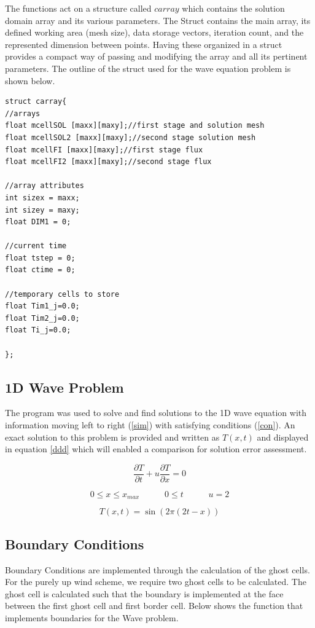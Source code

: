 \documentclass[paper=a4, fontsize=11pt, abstract=on]{scrartcl}
\numberwithin{equation}{section}		%
\numberwithin{figure}{section}			%
\numberwithin{table}{section}				%
\begin{document}
The functions act on a structure called $carray$ which contains the solution domain array and its various parameters. The Struct contains the main array, its defined working area (mesh size), data storage vectors, iteration count, and the represented dimension between points. Having these organized in a struct provides a compact way of passing and modifying the array and all its pertinent parameters. The outline of the struct used for the wave equation problem is shown below.


\begin{lstlisting}
struct carray{
//arrays
float mcellSOL [maxx][maxy];//first stage and solution mesh
float mcellSOL2 [maxx][maxy];//second stage solution mesh
float mcellFI [maxx][maxy];//first stage flux
float mcellFI2 [maxx][maxy];//second stage flux

//array attributes
int sizex = maxx;
int sizey = maxy;
float DIM1 = 0;

//current time 
float tstep = 0;
float ctime = 0;

//temporary cells to store
float Tim1_j=0.0;
float Tim2_j=0.0;
float Ti_j=0.0;

};
\end{lstlisting}
 
\subsection{1D Wave Problem}
The program was used to solve and find solutions to the 1D wave equation with information moving left to right (\ref{sim}) with satisfying conditions (\ref{con}). An exact solution to this problem is provided and written as $T(x,t)$ and displayed in equation \ref{ddd} which will enabled a comparison for solution error assessment. 

 \begin{equation}
\label{sim}
\frac{\partial T}{\partial t} + u\frac{\partial T}{\partial x} = 0
\end{equation}

 \begin{equation}
\label{con}
0\leq x \leq x_{max} \hspace{35pt} 0 \leq t \hspace{35pt} u = 2
\end{equation}

 \begin{equation}
\label{ddd}
T(x,t) = \sin{(2\pi (2t-x))}
\end{equation}

\subsection{Boundary Conditions}
Boundary Conditions are implemented through the calculation of the ghost cells. For the purely up wind scheme, we require two ghost cells to be calculated. The ghost cell is calculated such that the boundary is implemented at the face between the first ghost cell and first border cell. Below shows the function that implements boundaries for the Wave problem.
\end{document}
